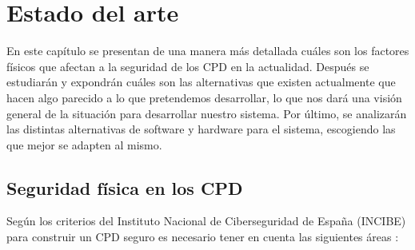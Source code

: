 \chapter{Estado del arte}
\label{ch:estado}
En este capítulo se presentan de una manera más detallada cuáles son los factores físicos que afectan a la seguridad de los CPD en la actualidad. Después se estudiarán y expondrán cuáles son las alternativas que existen actualmente que hacen algo parecido a lo que pretendemos desarrollar, lo que nos dará una visión general de la situación para desarrollar nuestro sistema. Por último, se analizarán las distintas alternativas de software y hardware para el sistema, escogiendo las que mejor se adapten al mismo.

\section{Seguridad física en los CPD}
Según los criterios del Instituto Nacional de Ciberseguridad de España (INCIBE) para construir un CPD seguro es necesario tener en cuenta las siguientes áreas \cite{noauthor_pon_2015}:
